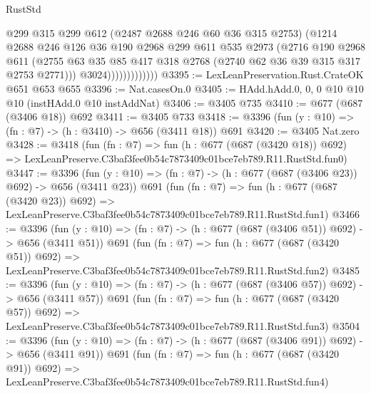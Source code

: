 \begin{lexlean}{RustStd}
\begin{coremodule}
                            @299
                            @315
                            @299
                            @612
                            (@2487 @2688 @246 @60 @36 @315 @2753)
                            (@1214
                              @2688
                              @246
                              @126
                              @36
                              @190
                              @2968
                              @299
                              @611
                              @535
                              @2973
                              (@2716
                                @190
                                @2968
                                @611
                                (@2755
                                  @63
                                  @35
                                  @85
                                  @417
                                  @318
                                  @2768
                                  (@2740 @62 @36 @39 @315 @317 @2753 @2771)))
                              @3024)))))))))))))
@3395 := LexLeanPreservation.Rust.CrateOK @651 @653 @655
@3396 := Nat.casesOn.{0}
@3405 := HAdd.hAdd.{0, 0, 0} @10 @10 @10 (instHAdd.{0} @10 instAddNat)
@3406 := @3405 @735
@3410 := @677 (@687 (@3406 @18)) @692
@3411 := @3405 @733
@3418 := @3396 (fun (y : @10) => (fn : @7) -> (h : @3410) -> @656 (@3411 @18)) @691
@3420 := @3405 Nat.zero
@3428 := @3418
    (fun (fn : @7) =>
    fun (h : @677 (@687 (@3420 @18)) @692) =>
    LexLeanPreserve.C3baf3fee0b54c7873409c01bce7eb789.R11.RustStd.fun0)
@3447 := @3396
    (fun (y : @10) => (fn : @7) -> (h : @677 (@687 (@3406 @23)) @692) -> @656 (@3411 @23))
    @691
    (fun (fn : @7) =>
    fun (h : @677 (@687 (@3420 @23)) @692) =>
    LexLeanPreserve.C3baf3fee0b54c7873409c01bce7eb789.R11.RustStd.fun1)
@3466 := @3396
    (fun (y : @10) => (fn : @7) -> (h : @677 (@687 (@3406 @51)) @692) -> @656 (@3411 @51))
    @691
    (fun (fn : @7) =>
    fun (h : @677 (@687 (@3420 @51)) @692) =>
    LexLeanPreserve.C3baf3fee0b54c7873409c01bce7eb789.R11.RustStd.fun2)
@3485 := @3396
    (fun (y : @10) => (fn : @7) -> (h : @677 (@687 (@3406 @57)) @692) -> @656 (@3411 @57))
    @691
    (fun (fn : @7) =>
    fun (h : @677 (@687 (@3420 @57)) @692) =>
    LexLeanPreserve.C3baf3fee0b54c7873409c01bce7eb789.R11.RustStd.fun3)
@3504 := @3396
    (fun (y : @10) => (fn : @7) -> (h : @677 (@687 (@3406 @91)) @692) -> @656 (@3411 @91))
    @691
    (fun (fn : @7) =>
    fun (h : @677 (@687 (@3420 @91)) @692) =>
    LexLeanPreserve.C3baf3fee0b54c7873409c01bce7eb789.R11.RustStd.fun4)

\end{coremodule}
\end{lexlean}
